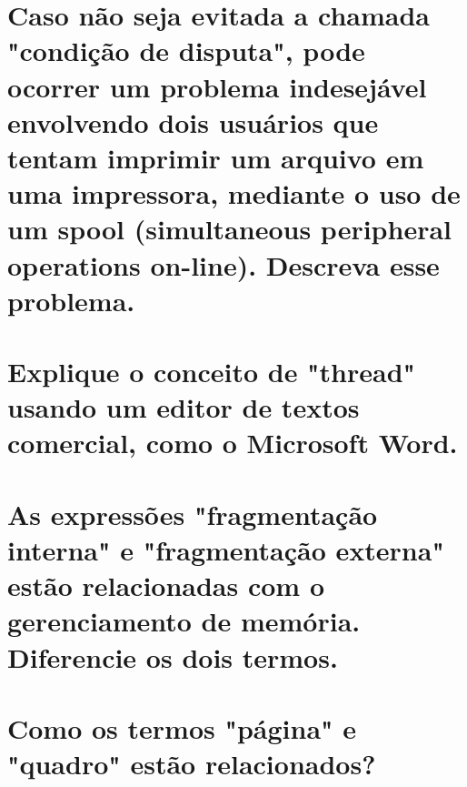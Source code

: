 \documentclass[11pt]{article}
\begin{document}
\section{Caso não seja evitada a chamada "condição de disputa", pode ocorrer um problema indesejável envolvendo dois usuários que tentam imprimir um arquivo em uma impressora, mediante o uso de um spool (simultaneous peripheral operations on-line). Descreva esse problema.}
\begin{linenumbers}
\resetlinenumber
\noindent\makebox[\linewidth]{\rule{\textwidth}{0.5pt}}
\noindent\makebox[\linewidth]{\rule{\textwidth}{0.5pt}}
\noindent\makebox[\linewidth]{\rule{\textwidth}{0.5pt}}
\noindent\makebox[\linewidth]{\rule{\textwidth}{0.5pt}}
\noindent\makebox[\linewidth]{\rule{\textwidth}{0.5pt}}
\noindent\makebox[\linewidth]{\rule{\textwidth}{0.5pt}}
\noindent\makebox[\linewidth]{\rule{\textwidth}{0.5pt}}
\noindent\makebox[\linewidth]{\rule{\textwidth}{0.5pt}}
\end{linenumbers}

\section{Explique o conceito de "thread" usando um editor de textos comercial, como o Microsoft Word.}
\begin{linenumbers}
\resetlinenumber
\noindent\makebox[\linewidth]{\rule{\textwidth}{0.5pt}}
\noindent\makebox[\linewidth]{\rule{\textwidth}{0.5pt}}
\noindent\makebox[\linewidth]{\rule{\textwidth}{0.5pt}}
\noindent\makebox[\linewidth]{\rule{\textwidth}{0.5pt}}
\noindent\makebox[\linewidth]{\rule{\textwidth}{0.5pt}}
\end{linenumbers}

\section{As expressões "fragmentação interna" e "fragmentação externa" estão relacionadas com o gerenciamento de memória. Diferencie os dois termos.}
\begin{linenumbers}
\resetlinenumber
\noindent\makebox[\linewidth]{\rule{\textwidth}{0.5pt}}
\noindent\makebox[\linewidth]{\rule{\textwidth}{0.5pt}}
\noindent\makebox[\linewidth]{\rule{\textwidth}{0.5pt}}
\noindent\makebox[\linewidth]{\rule{\textwidth}{0.5pt}}
\noindent\makebox[\linewidth]{\rule{\textwidth}{0.5pt}}
\end{linenumbers}

\section{Como os termos "página" e "quadro" estão relacionados?}
\begin{linenumbers}
\resetlinenumber
\noindent\makebox[\linewidth]{\rule{\textwidth}{0.5pt}}
\noindent\makebox[\linewidth]{\rule{\textwidth}{0.5pt}}
\noindent\makebox[\linewidth]{\rule{\textwidth}{0.5pt}}
\noindent\makebox[\linewidth]{\rule{\textwidth}{0.5pt}}
\noindent\makebox[\linewidth]{\rule{\textwidth}{0.5pt}}
\end{linenumbers}
\end{document}
